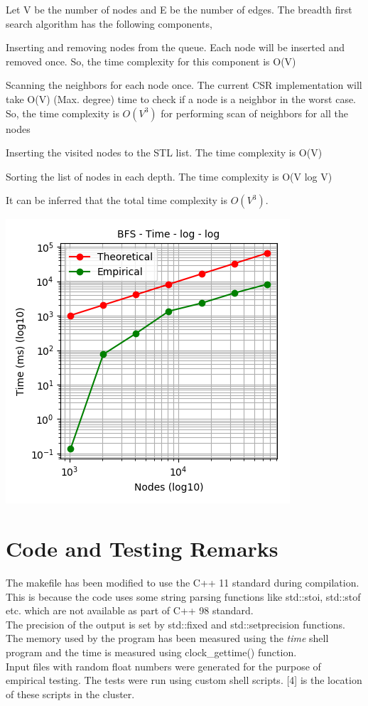 \documentclass[11pt,a4paper,oneside]{article}
\begin{document}
    Let V be the number of nodes and E be the number of edges. The breadth first search algorithm has the following components,
    \begin{list}{*}{}
    	\item Inserting and removing nodes from the queue. Each node will be inserted and removed once. So, the time complexity for this component is O(V)
    	\item Scanning the neighbors for each node once. The current CSR implementation will take O(V) (Max. degree) time to check if a node is a neighbor in the worst case. So, the time complexity is $O(V^3)$ for performing scan of neighbors for all the nodes
    	\item Inserting the visited nodes to the STL list. The time complexity is O(V)
    	\item Sorting the list of nodes in each depth. The time complexity is O(V log V) 
    \end{list}
    It can be inferred that the total time complexity is $O(V^3)$.

    \begin{center}
    	\includegraphics[scale=0.6]{7.png}		
    \end{center}

    \section{Code and Testing Remarks}
    The makefile has been modified to use the C++ 11 standard during compilation. This is because the code uses some string parsing functions like std::stoi, std::stof etc. which are not available as part of C++ 98 standard. \\
    \newline
    The precision of the output is set by std::fixed and std::setprecision functions. The memory used by the program has been measured using the \emph{time} shell program and the time is measured using clock\_gettime() function. \\
    \newline
    Input files with random float numbers were generated for the purpose of empirical testing. The tests were run using custom shell scripts. [4] is the location of these scripts in the cluster.
    
\end{document}
